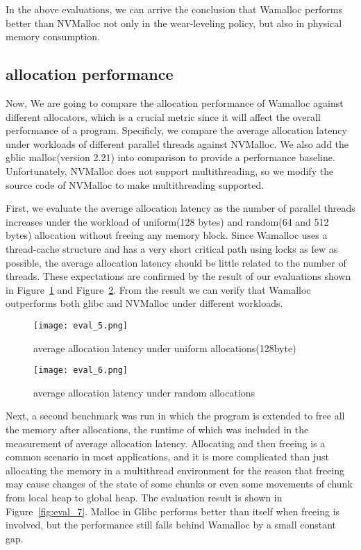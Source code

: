 \documentclass[10pt, conference, compsocconf]{IEEEtran}
\begin{document}
In the above evaluations, we can arrive the conclusion that
Wamalloc performs better than NVMalloc not only in the wear-leveling policy,
but also in physical memory consumption.

\subsection{allocation performance}

Now, We are going to compare the allocation performance of Wamalloc against different allocators,
which is a crucial metric since it will affect the overall performance of a program.
Specificly, we compare the average allocation latency under workloads of different parallel threads against NVMalloc.
We also add the gblic malloc(version 2.21) into comparison to provide a performance baseline.
Unfortunately, NVMalloc does not support multithreading,
so we modify the source code of NVMalloc to make multithreading supported.

First, we evaluate the average allocation latency as the number of parallel threads increases
under the workload of uniform(128 bytes) and random(64 and 512 bytes) allocation without freeing any memory block.
Since Wamalloc uses a thread-cache structure and has a very short critical path using locks as few as possible,
the average allocation latency should be little related to the number of threads.
These expectations are confirmed by the result of our evaluations shown in Figure~\ref{fig:eval_5} and Figure~\ref{fig:eval_6}.
From the result we can verify that Wamalloc outperforms both glibc and NVMalloc under different workloads.


\begin{figure}[t]
\centering
\texttt{[image: eval\_5.png]}
\caption{average allocation latency under uniform allocations(128byte)}
\label{fig:eval_5}
\end{figure}

\begin{figure}[t]
\centering
\texttt{[image: eval\_6.png]}
\caption{average allocation latency under random allocations}
\label{fig:eval_6}
\end{figure}

Next, a second benchmark was run in which the program is extended to free all the memory after allocations, 
the runtime of which was included in the measurement of average allocation latency.
Allocating and then freeing is a common scenario in most applications, 
and it is more complicated than just allocating the memory in a multithread environment 
for the reason that freeing may cause changes of the state of some chunks or even some movements of chunk from local heap to global heap.
The evaluation result is shown in Figure~\ref{fig:eval_7}.
Malloc in Glibc performs better than itself when freeing is involved, 
but the performance still falls behind Wamalloc by a small constant gap.
\end{document}
